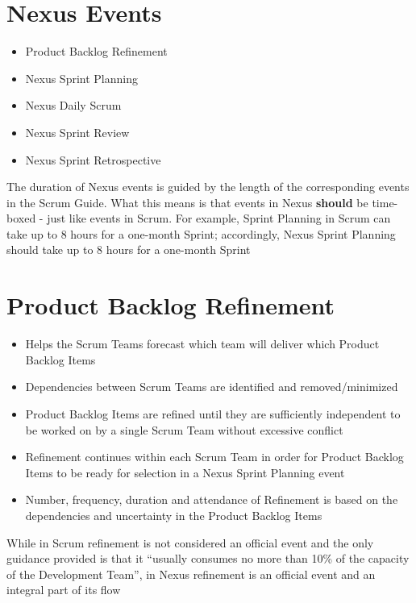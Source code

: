 \documentclass[a4paper,11pt,twocolumn]{article}
\begin{document}
\section*{Nexus Events}
\begin{itemize}
	\item Product Backlog Refinement
	\item Nexus Sprint Planning
	\item Nexus Daily Scrum
	\item Nexus Sprint Review
	\item Nexus Sprint Retrospective
\end{itemize}

\begin{tcolorbox}[colback=black!8!white,colframe=gray!50!black,title=Note,sharp corners,fonttitle=\normalsize\bfseries,fontupper=\normalsize]
	The duration of Nexus events is guided by the length of the corresponding events in the Scrum Guide. What this means is that events in Nexus \textbf{should} be time-boxed - just like events in Scrum. For example, Sprint Planning in Scrum can take up to 8 hours for a one-month Sprint; accordingly, Nexus Sprint Planning should take up to 8 hours for a one-month Sprint
\end{tcolorbox}

\section*{Product Backlog Refinement}
\begin{itemize}
	\item Helps the Scrum Teams forecast which team will deliver which Product Backlog Items
	\item Dependencies between Scrum Teams are identified and removed/minimized
	\item Product Backlog Items are refined until they are sufficiently independent to be worked on by a single Scrum Team without excessive conflict
	\item Refinement continues within each Scrum Team in order for Product Backlog Items to be ready for selection in a Nexus Sprint Planning event
	\item Number, frequency, duration and attendance of Refinement is based on the dependencies and uncertainty in the Product Backlog Items
\end{itemize}

\begin{tcolorbox}[colback=black!8!white,colframe=gray!50!black,title=Note,sharp corners,fonttitle=\normalsize\bfseries,fontupper=\normalsize]
	While in Scrum refinement is not considered an official event and the only guidance provided is that it ``usually consumes no more than 10\% of the capacity of the Development Team'', in Nexus refinement is an official event and an integral part of its flow
\end{tcolorbox}
\end{document}
